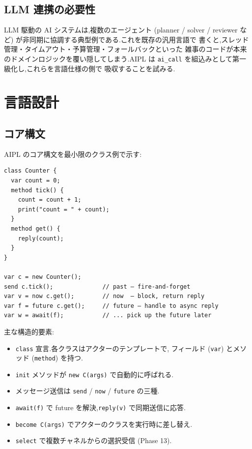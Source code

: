 \documentclass[11pt,a4paper]{article}
\newcommand{\code}[1]{\texttt{\small #1}}
\begin{document}
\subsection{LLM 連携の必要性}

LLM 駆動の AI システムは,複数のエージェント (planner / solver /
reviewer など) が非同期に協調する典型例である.これを既存の汎用言語で
書くと,スレッド管理・タイムアウト・予算管理・フォールバックといった
雑事のコードが本来のドメインロジックを覆い隠してしまう.AIPL は
\code{ai\_call} を組込みとして第一級化し,これらを言語仕様の側で
吸収することを試みる.

\section{言語設計}
\label{sec:design}

\subsection{コア構文}

AIPL のコア構文を最小限のクラス例で示す:

\begin{lstlisting}
class Counter {
  var count = 0;
  method tick() {
    count = count + 1;
    print("count = " + count);
  }
  method get() {
    reply(count);
  }
}

var c = new Counter();
send c.tick();              // past — fire-and-forget
var v = now c.get();        // now  — block, return reply
var f = future c.get();     // future — handle to async reply
var w = await(f);           // ... pick up the future later
\end{lstlisting}

主な構造的要素:

\begin{itemize}[leftmargin=*,itemsep=0pt]
  \item \texttt{class} 宣言.各クラスはアクターのテンプレートで,
    フィールド (\code{var}) とメソッド (\code{method}) を持つ.
  \item \texttt{init} メソッドが \code{new C(args)} で自動的に呼ばれる.
  \item メッセージ送信は \code{send} / \code{now} / \code{future} の三種.
  \item \code{await(f)} で future を解決,\code{reply(v)} で同期送信に応答.
  \item \code{become C(args)} でアクターのクラスを実行時に差し替え.
  \item \code{select} で複数チャネルからの選択受信 (Phase 13).
\end{itemize}
\end{document}
